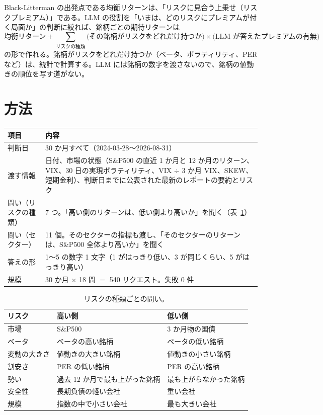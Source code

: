 \documentclass[xelatex,ja=standard,jafont=hiragino-pron,a4paper,10pt]{bxjsreport}
\newcommand{\SP}{S\&P500}
\newcommand{\tabref}[1]{表~\ref{#1}}
\begin{document}
Black-Litterman の出発点である均衡リターンは、「リスクに見合う上乗せ（リスクプレミアム）」である。LLM の役割を「いまは、どのリスクにプレミアムが付く局面か」の判断に絞れば、銘柄ごとの期待リターンは
\[
\text{均衡リターン} + \sum_{\text{リスクの種類}} \bigl(\text{その銘柄がリスクをどれだけ持つか}\bigr) \times \bigl(\text{LLM が答えたプレミアムの有無}\bigr)
\]
の形で作れる。銘柄がリスクをどれだけ持つか（ベータ、ボラティリティ、PER など）は、統計で計算する。LLM には銘柄の数字を渡さないので、銘柄の値動きの順位を写す道がない。

\section{方法}

\begin{longtable}{p{3.20cm}p{11.20cm}}
\toprule
\textbf{項目} & \textbf{内容} \\
\midrule
\endfirsthead
\bottomrule
\endfoot
判断日 & 30 か月すべて（2024-03-28〜2026-08-31） \\
渡す情報 & 日付、市場の状態（\SP{} の直近 1 か月と 12 か月のリターン、VIX、30 日の実現ボラティリティ、VIX $\div$ 3 か月 VIX、SKEW、短期金利）、判断日までに公表された最新のレポートの要約とリスク \\
問い（リスクの種類） & 7 つ。「高い側のリターンは、低い側より高いか」を聞く（\tabref{tab:gq}） \\
問い（セクター） & 11 個。そのセクターの指標も渡し、「そのセクターのリターンは、\SP{} 全体より高いか」を聞く \\
答えの形 & 1〜5 の数字 1 文字（1 がはっきり低い、3 が同じくらい、5 がはっきり高い） \\
規模 & 30 か月 $\times$ 18 問 $=$ 540 リクエスト。失敗 0 件 \\
\end{longtable}

\begin{table}[htbp]
\centering
\caption{リスクの種類ごとの問い。}
\label{tab:gq}
\small
\begin{tabular}{lll}
\toprule
リスク & 高い側 & 低い側 \\
\midrule
市場 & \SP{} & 3 か月物の国債 \\
ベータ & ベータの高い銘柄 & ベータの低い銘柄 \\
変動の大きさ & 値動きの大きい銘柄 & 値動きの小さい銘柄 \\
割安さ & PER の低い銘柄 & PER の高い銘柄 \\
勢い & 過去 12 か月で最も上がった銘柄 & 最も上がらなかった銘柄 \\
安全性 & 長期負債の軽い会社 & 重い会社 \\
規模 & 指数の中で小さい会社 & 最も大きい会社 \\
\bottomrule
\end{tabular}
\end{table}
\end{document}
